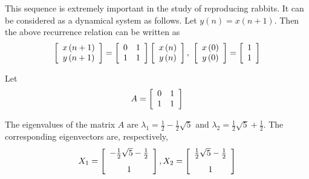 \begin{solution}
This sequence is extremely important in the study of reproducing rabbits. It
can be considered as a dynamical system as follows. Let $y\left( n\right)
=x\left( n+1\right) .$ Then the above recurrence relation can be written as
\begin{equation*}
\left[
\begin{array}{c}
x\left( n+1\right) \\
y\left( n+1\right)
\end{array}
\right] =\left[
\begin{array}{rr}
0 & 1 \\
1 & 1
\end{array}
\right] \left[
\begin{array}{c}
x\left( n\right) \\
y\left( n\right)
\end{array}
\right] ,\ \left[
\begin{array}{c}
x\left( 0\right) \\
y\left( 0\right)
\end{array}
\right] =\left[
\begin{array}{r}
1 \\
1
\end{array}
\right]
\end{equation*}

Let 
\begin{equation*}
A
=
\left[
\begin{array}{rr}
0 & 1 \\
1 & 1
\end{array}
\right]
\end{equation*}

The eigenvalues of the matrix $A$ are $\lambda_1 = \frac{1}{2}-\frac{1}{2}\sqrt{5}$ and 
$\lambda_2 = \frac{1}{2}\sqrt{5}+\frac{1}{2}$. The corresponding eigenvectors are, respectively,
\begin{equation*}
X_1 = 
\leftB
\begin{array}{c}
-\vspace{0.05in}\frac{1}{2}\sqrt{5}-\vspace{0.05in}\frac{1}{2} \\
1
\end{array}
\rightB ,
X_2 = \leftB
\begin{array}{c}
\vspace{0.05in}\frac{1}{2}\sqrt{5}-\vspace{0.05in}\frac{1}{2} \\
1
\end{array}
\rightB 
\end{equation*}


\end{solution}
